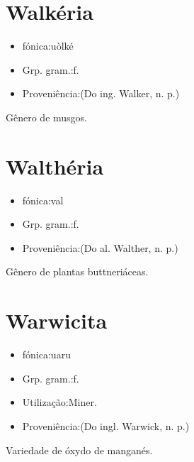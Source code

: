 \documentclass{article}
\begin{document}
\section{Walkéria}
\begin{itemize}
\item {fónica:uòlké}
\end{itemize}
\begin{itemize}
\item {Grp. gram.:f.}
\end{itemize}
\begin{itemize}
\item {Proveniência:(Do ing. \textunderscore Walker\textunderscore , n. p.)}
\end{itemize}
Gênero de musgos.
\section{Walthéria}
\begin{itemize}
\item {fónica:val}
\end{itemize}
\begin{itemize}
\item {Grp. gram.:f.}
\end{itemize}
\begin{itemize}
\item {Proveniência:(Do al. \textunderscore Walther\textunderscore , n. p.)}
\end{itemize}
Gênero de plantas buttneriáceas.
\section{Warwicita}
\begin{itemize}
\item {fónica:uaru}
\end{itemize}
\begin{itemize}
\item {Grp. gram.:f.}
\end{itemize}
\begin{itemize}
\item {Utilização:Miner.}
\end{itemize}
\begin{itemize}
\item {Proveniência:(Do ingl. \textunderscore Warwick\textunderscore , n. p.)}
\end{itemize}
Variedade de óxydo de manganés.
\end{document}
